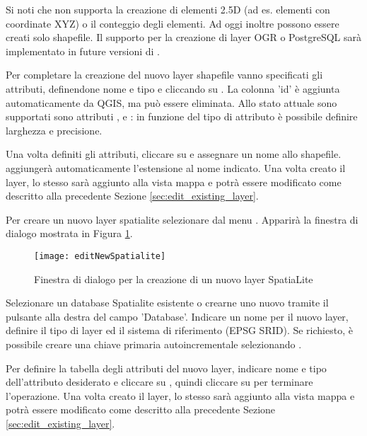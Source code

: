 Si noti che \qg non supporta la creazione di elementi 2.5D (ad es. elementi
con coordinate XYZ) o il conteggio degli elementi. Ad oggi inoltre possono
essere creati solo shapefile. Il supporto per la creazione di layer OGR o
PostgreSQL sarà implementato in future versioni di \qg. 

Per completare la creazione del nuovo layer shapefile vanno specificati gli attributi,
definendone nome e tipo e cliccando su . 
La colonna 'id' è aggiunta automaticamente da QGIS, ma può essere eliminata. 
Allo stato attuale sono supportati sono attributi , 
 e : in funzione del 
tipo di attributo è possibile definire larghezza e precisione. 

Una volta definiti gli attributi, cliccare su  e assegnare un nome allo shapefile.
\qg aggiungerà automaticamente l'estensione  al nome indicato.
Una volta creato il layer, lo stesso sarà aggiunto alla vista mappa e potrà essere
modificato come descritto alla precedente Sezione \ref{sec:edit_existing_layer}.

\label{sec:create spatialite}

Per creare un nuovo layer spatialite selezionare  \arrow
{} dal menu 
. Apparirà la finestra di dialogo  mostrata
in Figura \ref{fig:newspatialitelayer}.

\begin{figure}[ht]
   \centering
   \texttt{[image: editNewSpatialite]}
   \caption{Finestra di dialogo per la creazione di un nuovo layer SpatiaLite \nixcaption}\label{fig:newspatialitelayer}
\end{figure}

Selezionare un database Spatialite esistente o crearne uno nuovo tramite il pulsante 
 alla destra del campo 'Database'. Indicare un nome per il nuovo layer, definire
il tipo di layer ed il sistema di riferimento (EPSG SRID). Se richiesto, è possibile creare
una chiave primaria autoincrementale selezionando .

Per definire la tabella degli attributi del nuovo layer, indicare nome e tipo 
dell'attributo desiderato e cliccare su ,
quindi cliccare su  per terminare l'operazione.
Una volta creato il layer, lo stesso sarà aggiunto alla vista mappa e potrà essere
modificato come descritto alla precedente Sezione \ref{sec:edit_existing_layer}.

